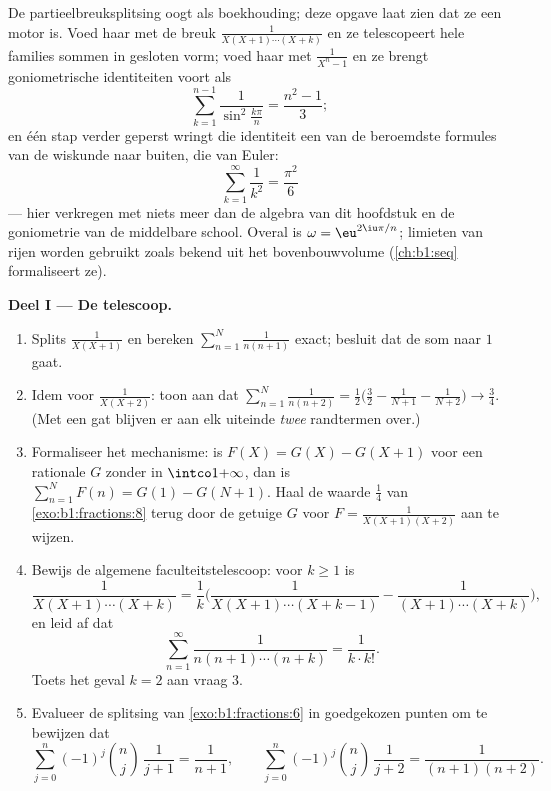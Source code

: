 \begin{problem}\label{pb:b1:fractions:1}
De partieelbreuksplitsing oogt als boekhouding; deze opgave laat zien dat
ze een motor is. Voed haar met de breuk $\frac1{X(X+1)\cdots(X+k)}$ en ze
telescopeert hele families sommen in gesloten vorm; voed haar met
$\frac1{X^n - 1}$ en ze brengt goniometrische identiteiten voort als
\[
\sum_{k=1}^{n-1}\frac{1}{\sin^2\frac{k\pi}{n}} = \frac{n^2-1}{3} ;
\]
en één stap verder geperst wringt die identiteit een van de beroemdste
formules van de wiskunde naar buiten, die van Euler:
\[
\sum_{k=1}^{\infty}\frac1{k^2} = \frac{\pi^2}{6}
\]
--- hier verkregen met niets meer dan de algebra van dit hoofdstuk en de
goniometrie van de middelbare
school.
Overal is $\omega = \eu^{2\iu\pi/n}$; limieten van rijen worden gebruikt
zoals bekend uit het bovenbouwvolume (\cref{ch:b1:seq} formaliseert ze).

\medskip
\noindent\textbf{Deel I --- De telescoop.}
\begin{enumerate}
  \item Splits $\frac1{X(X+1)}$ en bereken $\sum_{n=1}^{N}
        \frac1{n(n+1)}$ exact; besluit dat de som naar $1$ gaat.
  \item Idem voor $\frac1{X(X+2)}$: toon aan dat $\sum_{n=1}^{N}
        \frac1{n(n+2)} = \frac12\bigl(\frac32 - \frac1{N+1} -
        \frac1{N+2}\bigr) \to \frac34$. (Met een gat blijven er aan elk
        uiteinde \emph{twee} randtermen over.)
  \item Formaliseer het mechanisme: is $F(X) = G(X) - G(X+1)$ voor een
        rationale $G$ zonder  in $\intco1{+\infty}$, dan is
        $\sum_{n=1}^N F(n) = G(1) - G(N+1)$. Haal de waarde $\frac14$
        van \cref{exo:b1:fractions:8} terug door de getuige $G$ voor $F
        = \frac1{X(X+1)(X+2)}$ aan te wijzen.
  \item Bewijs de algemene faculteitstelescoop: voor $k \geq 1$ is
        \[
        \frac{1}{X(X+1)\cdots(X+k)}
        = \frac1k\biggl(\frac{1}{X(X+1)\cdots(X+k-1)}
        - \frac{1}{(X+1)\cdots(X+k)}\biggr),
        \]
        en leid af dat
        \[
        \sum_{n=1}^{\infty}\frac{1}{n(n+1)\cdots(n+k)}
        = \frac{1}{k \cdot k!} .
        \]
        Toets het geval $k = 2$ aan vraag 3.
  \item Evalueer de splitsing van \cref{exo:b1:fractions:6} in
        goedgekozen punten om te bewijzen dat
        \[
        \sum_{j=0}^{n}(-1)^j\binom nj\,\frac1{j+1}
        = \frac1{n+1},
        \qquad
        \sum_{j=0}^{n}(-1)^j\binom nj\,\frac1{j+2}
        = \frac1{(n+1)(n+2)} .
        \]
\end{enumerate}


\end{problem}
